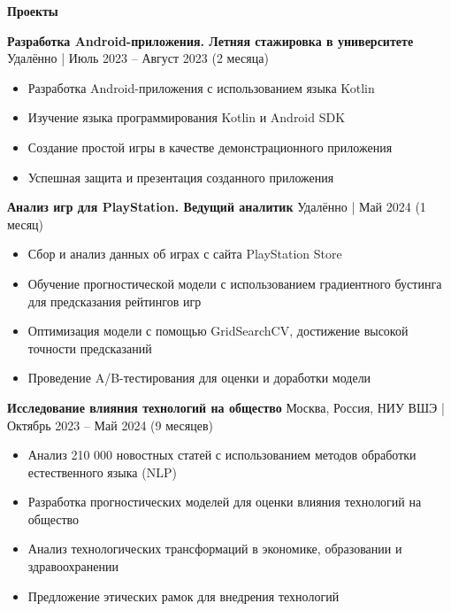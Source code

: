 \begin{center}
    \textbf{Проекты}
\end{center}

\textbf{Разработка Android-приложения. Летняя стажировка в университете} \hfill Удалённо | Июль 2023 – Август 2023 (2 месяца)
\begin{itemize}[noitemsep, topsep=0pt, partopsep=0pt, parsep=0pt]
    \item Разработка Android-приложения с использованием языка Kotlin
    \item Изучение языка программирования Kotlin и Android SDK
    \item Создание простой игры в качестве демонстрационного приложения
    \item Успешная защита и презентация созданного приложения
\end{itemize}

\textbf{Анализ игр для PlayStation. Ведущий аналитик} \hfill Удалённо | Май 2024 (1 месяц)
\begin{itemize}[noitemsep, topsep=0pt, partopsep=0pt, parsep=0pt]
    \item Сбор и анализ данных об играх с сайта PlayStation Store
    \item Обучение прогностической модели с использованием градиентного бустинга для предсказания рейтингов игр
    \item Оптимизация модели с помощью GridSearchCV, достижение высокой точности предсказаний
    \item Проведение A/B-тестирования для оценки и доработки модели
\end{itemize}

\textbf{Исследование влияния технологий на общество} \hfill Москва, Россия, НИУ ВШЭ | Октябрь 2023 – Май 2024 (9 месяцев)
\begin{itemize}[noitemsep, topsep=0pt, partopsep=0pt, parsep=0pt]
    \item Анализ 210 000 новостных статей с использованием методов обработки естественного языка (NLP)
    \item Разработка прогностических моделей для оценки влияния технологий на общество
    \item Анализ технологических трансформаций в экономике, образовании и здравоохранении
    \item Предложение этических рамок для внедрения технологий
\end{itemize}

